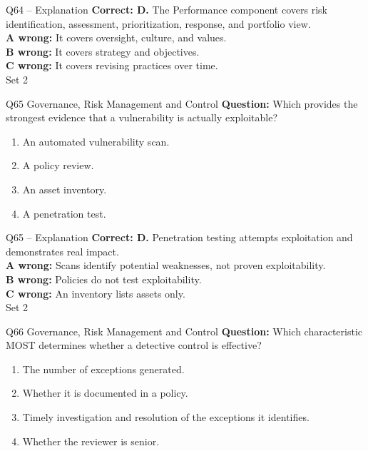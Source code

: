 \documentclass[aspectratio=169,10pt]{beamer}
\begin{document}
\begin{frame}[t]{Q64 -- Explanation}
	\footnotesize
	\textbf{Correct: D.} The Performance component covers risk identification, assessment, prioritization, response, and portfolio view. \\[5pt]
\textbf{A wrong:} It covers oversight, culture, and values. \\[3pt]
\textbf{B wrong:} It covers strategy and objectives. \\[3pt]
\textbf{C wrong:} It covers revising practices over time. \\[3pt]
	\vfill {\tiny Set 2}
\end{frame}

\begin{frame}[t]{Q65 \hfill {\scriptsize Governance, Risk Management and Control}}
	\small
	\textbf{Question:} Which provides the strongest evidence that a vulnerability is actually exploitable?
	\begin{enumerate}[label=\Alph*.,itemsep=1pt,topsep=3pt]
			\item An automated vulnerability scan.
			\item A policy review.
			\item An asset inventory.
			\item A penetration test.
	\end{enumerate}
\end{frame}

\begin{frame}[t]{Q65 -- Explanation}
	\footnotesize
	\textbf{Correct: D.} Penetration testing attempts exploitation and demonstrates real impact. \\[5pt]
\textbf{A wrong:} Scans identify potential weaknesses, not proven exploitability. \\[3pt]
\textbf{B wrong:} Policies do not test exploitability. \\[3pt]
\textbf{C wrong:} An inventory lists assets only. \\[3pt]
	\vfill {\tiny Set 2}
\end{frame}

\begin{frame}[t]{Q66 \hfill {\scriptsize Governance, Risk Management and Control}}
	\small
	\textbf{Question:} Which characteristic MOST determines whether a detective control is effective?
	\begin{enumerate}[label=\Alph*.,itemsep=1pt,topsep=3pt]
			\item The number of exceptions generated.
			\item Whether it is documented in a policy.
			\item Timely investigation and resolution of the exceptions it identifies.
			\item Whether the reviewer is senior.
	\end{enumerate}
\end{frame}
\end{document}
